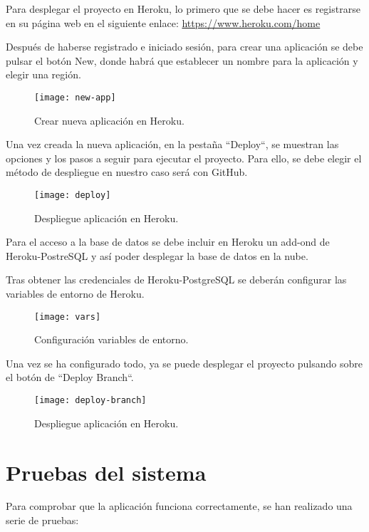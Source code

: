 Para desplegar el proyecto en Heroku, lo primero que se debe hacer es
registrarse en su página web en el siguiente enlace: \url{https://www.heroku.com/home}

Después de haberse registrado e iniciado sesión, para crear una aplicación se debe pulsar el botón New, donde habrá que establecer un nombre para la aplicación y elegir una región.
    \begin{figure}[htbp]
    \centering
    \texttt{[image: new-app]}
    \caption{Crear nueva aplicación en Heroku.}
    \label{fig:new-app}
    \end{figure}

Una vez creada la nueva aplicación, en la pestaña ``Deploy``, se muestran las opciones y los pasos a seguir para ejecutar el proyecto. Para ello, se debe elegir el método de despliegue en nuestro caso será con GitHub.
\newpage
    \begin{figure}[htbp]
    \centering
    \texttt{[image: deploy]}
    \caption{Despliegue aplicación en Heroku.}
    \label{fig:deploy}
    \end{figure}


Para el acceso a la base de datos se debe incluir en Heroku un add-ond de Heroku-PostreSQL y así poder desplegar la base de datos en la nube. 

Tras obtener las credenciales de Heroku-PostgreSQL se deberán configurar las variables de entorno de Heroku.
    \begin{figure}[htbp]
    \centering
    \texttt{[image: vars]}
    \caption{Configuración variables de entorno.}
    \label{fig:vars}
    \end{figure}

Una vez se ha configurado todo, ya se puede desplegar el
proyecto pulsando sobre el botón de ``Deploy Branch``.
    \begin{figure}[htbp]
    \centering
    \texttt{[image: deploy-branch]}
    \caption{Despliegue aplicación en Heroku.}
    \label{fig:deploy-branch}
    \end{figure}
    
\section{Pruebas del sistema}

Para comprobar que la aplicación funciona correctamente, se han realizado una serie de pruebas:


